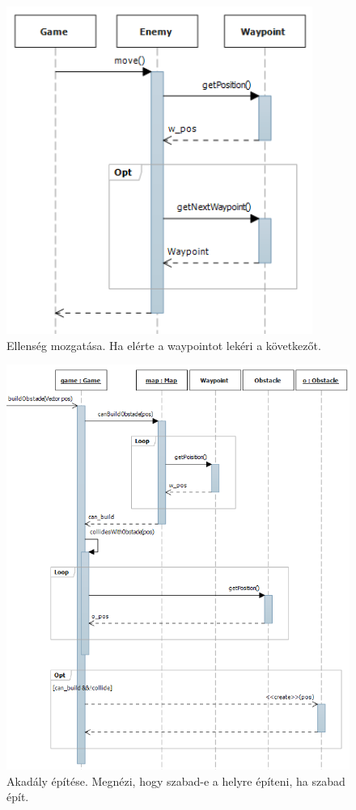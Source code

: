 \begin{figure}[H]
\begin{center}
\includegraphics[width=10cm]{images/ch04/move_enemy.png}
\caption{Ellenség mozgatása. Ha elérte a waypointot lekéri a következőt.}
\label{fig:moving_enemy}
\end{center}
\end{figure}

\begin{figure}[H]
\begin{center}
\includegraphics[width=480px]{images/ch04/build_obstacle.png}
\caption{Akadály építése. Megnézi, hogy szabad-e a helyre építeni, ha szabad épít.}
\label{fig:building_obstacle}
\end{center}
\end{figure}


